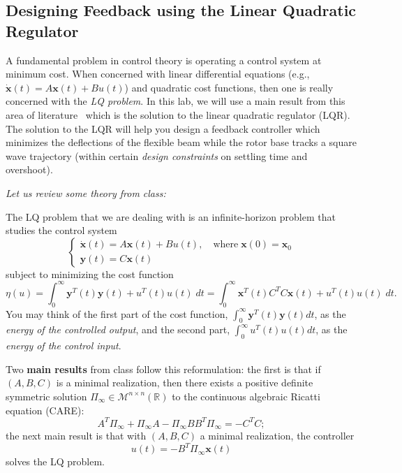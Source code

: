 \documentclass[12pt]{report}
\begin{document}
\subsection{Designing Feedback using the Linear Quadratic Regulator}\label{subsection:lab4_lqr}
A fundamental problem in control theory is operating a control system at minimum cost. When concerned with linear differential equations (e.g., $\mathbf{\dot{x}}(t) = A\mathbf{x}(t) + Bu(t)$) and quadratic cost functions, then one is really concerned with the \emph{LQ problem}. In this lab, we will use a main result from this area of literature~\cite{kwakernaak1972linear} which is the solution to the linear quadratic regulator (LQR). The solution to the LQR will help you design a feedback controller which minimizes the deflections of the flexible beam while the rotor base tracks a square wave trajectory (within certain \emph{design constraints} on settling time and overshoot).

\noindent \emph{Let us review some theory from class:}

The LQ problem that we are dealing with is an infinite-horizon problem that studies the control system
\[
    \begin{cases}
        \dot{\mathbf{x}}(t) = A\mathbf{x}(t)+Bu(t), \quad \text{where} \; \mathbf{x}(0) = \mathbf{x}_0 \\
        \mathbf{y}(t) = C \mathbf{x}(t)
    \end{cases}
\]
subject to minimizing the cost function
\[
    \eta(u) = \int_0^{\infty} \mathbf{y}^T(t)\mathbf{y}(t) + u^T(t)u(t) \; dt = \int_0^\infty  \mathbf{x}^T(t) C^T C \mathbf{x}(t) + u^T(t)u(t) \; dt.
\]
You may think of the first part of the cost function, $ \int_0^{\infty} \mathbf{y}^T(t)\mathbf{y}(t) dt$, as the \emph{energy of the controlled output}, and the second part, $\int_0^{\infty} u^T(t)u(t) dt$, as the \emph{energy of the control input}.

Two \textbf{main results} from class follow this reformulation: the first is that if $(A,B,C)$ is a minimal realization, then there exists a positive definite symmetric solution $\Pi_{\infty} \in \mathcal{M}^{n \times n}(\mathbb{R})$ to the continuous algebraic Ricatti equation (CARE):
\[
    A^T \Pi_{\infty} + \Pi_{\infty} A - \Pi_{\infty} B B^T \Pi_{\infty} = -C^T C;
\]
the next main result is that with $(A,B,C)$ a minimal realization, the controller
\[
    u(t) = -B^T \Pi_{\infty} \mathbf{x}(t)
\]
solves the LQ problem.
\end{document}
